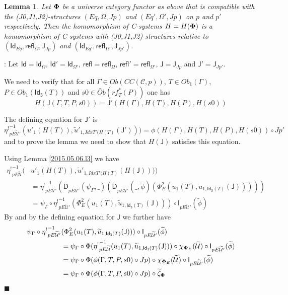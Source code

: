 \documentclass[12pt]{article}
\numberwithin{equation}{section}
\newenvironment{myproof}{{\bf Proof}:}{$\blacksquare$ \vskip 5mm }
\newtheorem{lemma}[proposition]{Lemma}
\newcommand{\llabel}[1]{\label{#1}}
\newcommand{\wt}{\widetilde}
\newcommand{\toCC}{CC} %
\newcommand{\C}{{\mathcal C}}  %
\newcommand{\Id}{\mathsf{Id}} %
\newcommand{\Idx}{\mathsf{Id_3}} %
\newcommand{\refl}{\mathsf{refl}}
\newcommand{\J}{\mathsf{J}}
\newcommand{\U}{\mathcal{U}}
\newcommand{\D}{\mathsf{D}}
\newcommand{\I}{\mathsf{I}}
\newcommand{\etashriek}{\eta^!}
\newcommand{\etaunshriek}{{\etashriek}^{-1}}
\newcommand{\Obwt}{\wt{Ob}}
\begin{document}
\begin{lemma}
\llabel{2015.04.12.l3} Let ${\bf\Phi}$ be a universe category functor as above
that is compatible with the (J0,J1,J2)-structures $(Eq,\Omega,Jp)$ and
$(Eq',\Omega',Jp)$ on $p$ and $p'$ respectively. Then the homomorphism of
C-systems $H=H({\bf\Phi})$ is a homomorphism of C-systems with
(J0,J1,J2)-structures relative to $(\Id_{Eq},\refl_{\Omega},\J_{Jp})$ and
$(\Id_{Eq'},\refl_{\Omega'},\J_{Jp'})$.
\end{lemma}
%
\begin{myproof}
Let $\Id=\Id_{\Omega}$, $\Id'=\Id_{\Omega'}$, $\refl=\refl_{\Omega}$,
$\refl'=\refl_{\Omega'}$, $\J=\J_{Jp}$ and $\J'=\J_{Jp'}$.

We need to verify that for all $\Gamma\in Ob(\toCC({\C},p))$, $T\in
Ob_1(\Gamma)$, $P\in Ob_1(\Idx(T))$ and $s0\in \Obwt(rf^*_T(P))$ one has
%
$$H(\J(\Gamma,T,P,s0))=\J'(H(\Gamma),H(T),H(P),H(s0))$$
%

The defining equation for $\J'$ is
%
$$\etaunshriek_{pE\wt{\U}'}(u'_1(H(T)),\wt{u}'_{1,{IdxT'(H(T)}}(\J')))=\phi(H(\Gamma),H(T),H(P),H(s0))\circ
Jp'$$
%
and to prove the lemma we need to show that $H(\J)$ satisfies this equation.

Using Lemma \ref{2015.05.06.l3} we have
%
\begin{align*}
  \etaunshriek_{pE\wt{\U}}(&u'_1(H(T)),\wt{u}'_{1,{IdxT'(H(T)}}(H(\J)))) \\
    & = \etaunshriek_{pE\wt{\U}'}(\D_{pE\wt{\U}'}(\psi_{\Gamma},\_)(\D_{pE\wt{\U}'}(\_,\wt{\phi})(\Phi_E^2(u_1(T),\wt{u}_{1,\Idx(T)}(\J))))) \\
    & = \psi_{\Gamma}\circ \etaunshriek_{pE\wt{\U}'}(\Phi_E^2(u_1(T),\wt{u}_{1,\Idx(T)}(\J)))\circ \I_{pE\wt{\U}'}(\wt{\phi})
\end{align*}
%
By \cite[Lemma 5.8]{fromunivwithPi} and by the defining equation for $\J$ we
further have
%
\begin{align*}
  \psi_{\Gamma}\circ \etaunshriek_{pE\wt{\U}'}&(\Phi_E^2(u_1(T),\wt{u}_{1,\Idx(T)}(\J)))\circ \I_{pE\wt{\U}'}(\wt{\phi}) \\
    & = \psi_{\Gamma}\circ \Phi(\etaunshriek_{pE\wt{\U}}(u_1(T),\wt{u}_{1,\Idx(T)}(\J)))\circ \chi_{{\bf\Phi}_E}(\wt{\U})\circ \I_{pE\wt{\U}'}(\wt{\phi}) \\
    & = \psi_{\Gamma}\circ \Phi(\phi(\Gamma,T,P,s0)\circ Jp)\circ \chi_{{\bf\Phi}_E}(\wt{\U})\circ \I_{pE\wt{\U}'}(\wt{\phi}) \\
    & = \psi_{\Gamma}\circ \Phi(\phi(\Gamma,T,P,s0)\circ Jp)\circ \wt{\zeta}_{\bf\Phi}
\end{align*}
%


\end{myproof}
\end{document}
